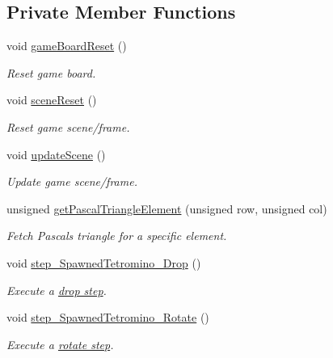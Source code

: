 \subsection*{Private Member Functions}
\begin{DoxyCompactItemize}
\item 
void \hyperlink{classTetreesEngine_ad28ed83be446f74c87d55d79cc64e6ef}{game\+Board\+Reset} ()
\begin{DoxyCompactList}\small\item\em Reset game board. \end{DoxyCompactList}\item 
void \hyperlink{classTetreesEngine_acb719449a68465839ebb0a5e7724cc34}{scene\+Reset} ()
\begin{DoxyCompactList}\small\item\em Reset game scene/frame. \end{DoxyCompactList}\item 
void \hyperlink{classTetreesEngine_a9aa3eec9561623f77eab13298ddad13c}{update\+Scene} ()
\begin{DoxyCompactList}\small\item\em Update game scene/frame. \end{DoxyCompactList}\item 
unsigned \hyperlink{classTetreesEngine_a087f12761b955478bff1d4e70e6c0549}{get\+Pascal\+Triangle\+Element} (unsigned row, unsigned col)
\begin{DoxyCompactList}\small\item\em Fetch Pascal\textquotesingle{}s triangle for a specific element. \end{DoxyCompactList}\item 
void \hyperlink{classTetreesEngine_a626d60fa8adb2dd024016b5cfed4f6ee}{step\+\_\+\+Spawned\+Tetromino\+\_\+\+Drop} ()
\begin{DoxyCompactList}\small\item\em Execute a \hyperlink{TetreesDefs_8hpp_a4d5a793092a473f85b4c1f7faf62afeda6df5f4c213c30a4ad91af7a5d10daa8e}{drop step}. \end{DoxyCompactList}\item 
void \hyperlink{classTetreesEngine_a90d1d65e12fb37850962305d8bc3b7a3}{step\+\_\+\+Spawned\+Tetromino\+\_\+\+Rotate} ()
\begin{DoxyCompactList}\small\item\em Execute a \hyperlink{TetreesDefs_8hpp_a4d5a793092a473f85b4c1f7faf62afeda22387bf41fe41a5ac2b7b74ab8f5c342}{rotate step}. \end{DoxyCompactList}\item 

\end{DoxyCompactItemize}
